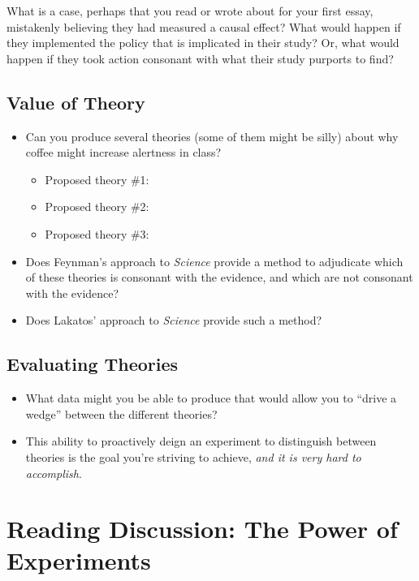 \documentclass[
]{book}
\providecommand{\tightlist}{%
  \setlength{\itemsep}{0pt}\setlength{\parskip}{0pt}}
\begin{document}
What is a case, perhaps that you read or wrote about for your first
essay, mistakenly believing they had measured a causal effect? What
would happen if they implemented the policy that is implicated in their
study? Or, what would happen if they took action consonant with what
their study purports to find?

\hypertarget{value-of-theory}{%
\subsection{Value of Theory}\label{value-of-theory}}

\begin{itemize}
\tightlist
\item
  Can you produce several theories (some of them might be silly) about
  why coffee might increase alertness in class?

  \begin{itemize}
  \tightlist
  \item
    Proposed theory \#1:
  \item
    Proposed theory \#2:
  \item
    Proposed theory \#3:
  \end{itemize}
\item
  Does Feynman's approach to \emph{Science} provide a method to
  adjudicate which of these theories is consonant with the evidence, and
  which are not consonant with the evidence?
\item
  Does Lakatos' approach to \emph{Science} provide such a method?
\end{itemize}

\hypertarget{evaluating-theories}{%
\subsection{Evaluating Theories}\label{evaluating-theories}}

\begin{itemize}
\tightlist
\item
  What data might you be able to produce that would allow you to ``drive
  a wedge'' between the different theories?
\item
  This ability to proactively deign an experiment to distinguish between
  theories is the goal you're striving to achieve, \emph{and it is very
  hard to accomplish}.
\end{itemize}

\hypertarget{reading-discussion-the-power-of-experiments}{%
\section{Reading Discussion: The Power of
Experiments}\label{reading-discussion-the-power-of-experiments}}
\end{document}
